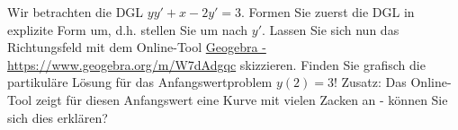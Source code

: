 \item Wir betrachten die DGL $yy'+x-2y'=3$. Formen Sie zuerst die DGL in explizite Form um, d.h. stellen Sie um nach $y'$. Lassen Sie sich nun das Richtungsfeld mit dem Online-Tool \href{https://www.geogebra.org/m/W7dAdgqc}{Geogebra - https://www.geogebra.org/m/W7dAdgqc} skizzieren. Finden Sie grafisch die partikuläre Lösung für das  Anfangswertproblem $y(2)=3$! Zusatz: Das Online-Tool zeigt für diesen Anfangswert eine Kurve mit vielen Zacken an - können Sie sich dies erklären?
